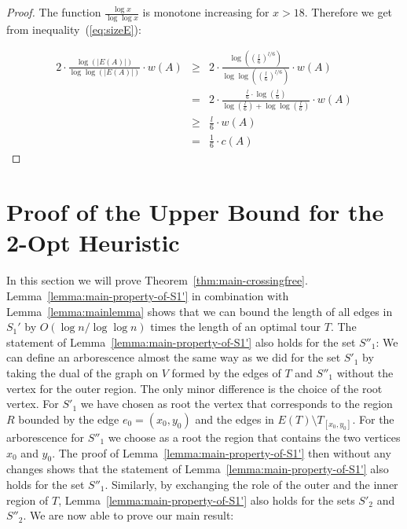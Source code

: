\documentclass[a4paper, 11pt]{article}
\def\blue#1{#1}
\begin{document}
\begin{proof}
The function $\frac{\log x}{\log \log x}$ is monotone increasing for $x > 18$. Therefore we get from inequality~(\ref{eq:sizeE}): 

\begin{eqnarray*}
2\cdot \frac{\log(|E(A)|)}{\log\log(|E(A)|)}\cdot w(A) 
& \ge & 2\cdot \frac{\log\left(\left(\frac{l}{6}\right)^{l/6}\right)}{\log\log\left(\left(\frac{l}{6}\right)^{l/6}\right)}\cdot w(A)\\
& = & 2\cdot \frac{\frac{l}{6} \cdot \log\left(\frac{l}{6}\right)}{\log\left(\frac{l}{6}\right) + \log\log\left(\frac{l}{6}\right)}\cdot w(A)\\ 
& \ge & \frac{l}{6} \cdot w(A)\\
& = & \frac{1}{6} \cdot c(A)
\end{eqnarray*}

\end{proof}






\section{Proof of the Upper Bound for the 2-Opt Heuristic}
\label{sec:proof}

In this section we will prove Theorem~\ref{thm:main-crossingfree}.
Lemma~\ref{lemma:main-property-of-S1'} in combination with Lemma~\ref{lemma:mainlemma} shows that we can bound the length of
all edges in $S_1'$ by $O(\log n/\log \log n)$ times the length of an optimal tour $T$.
The statement of Lemma~\ref{lemma:main-property-of-S1'} also holds for the set $S''_1$: We can define an arborescence almost the same way as we did 
for the set $S'_1$ by taking the dual of the graph on $V$ formed by the edges of $T$ and $S''_1$ without the vertex for the outer region. The
only minor difference is the choice of the root vertex. For $S'_1$ we have chosen as root the vertex that corresponds to the region $R$
bounded by the edge $e_0=(x_0,y_0)$ and the edges in $E(T)\setminus T_{[x_0,y_0]}$. For the arborescence for $S''_1$ we choose as a root the region 
that contains \blue{the two vertices $x_0$ and $y_0$}.  The proof of Lemma~\ref{lemma:main-property-of-S1'} then without any changes shows that the statement of
Lemma~\ref{lemma:main-property-of-S1'} also holds for the set $S''_1$. Similarly, by exchanging the role of the outer and the inner region of $T$,
Lemma~\ref{lemma:main-property-of-S1'} also holds for the sets $S'_2$ and $S''_2$. We are now able to prove our main result:\medskip
\end{document}

